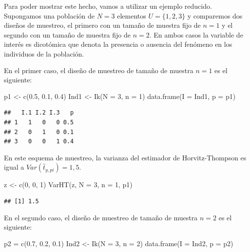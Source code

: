 \documentclass[
  10pt,
  spanish,
]{book}
\newenvironment{Shaded}{\begin{snugshade}}{\end{snugshade}}
\newcommand{\AttributeTok}[1]{\textcolor[rgb]{0.77,0.63,0.00}{#1}}
\newcommand{\DecValTok}[1]{\textcolor[rgb]{0.00,0.00,0.81}{#1}}
\newcommand{\FloatTok}[1]{\textcolor[rgb]{0.00,0.00,0.81}{#1}}
\newcommand{\FunctionTok}[1]{\textcolor[rgb]{0.00,0.00,0.00}{#1}}
\newcommand{\NormalTok}[1]{#1}
\newcommand{\OtherTok}[1]{\textcolor[rgb]{0.56,0.35,0.01}{#1}}
\begin{document}
Para poder mostrar este hecho, vamos a utilizar un ejemplo reducido. Supongamos una población de \(N = 3\) elementos \(U=\{1, 2, 3\}\) y comparemos dos diseños de muestreo, el primero con un tamaño de muestra fijo de \(n=1\) y el segundo con un tamaño de muestra fijo de \(n=2\). En ambos casos la variable de interés es dicotómica que denota la presencia o ausencia del fenómeno en los individuos de la población.

En el primer caso, el diseño de muestreo de tamaño de muestra \(n=1\) es el siguiente:

\begin{Shaded}
\begin{Highlighting}[]
\NormalTok{p1 }\OtherTok{\textless{}{-}} \FunctionTok{c}\NormalTok{(}\FloatTok{0.5}\NormalTok{, }\FloatTok{0.1}\NormalTok{, }\FloatTok{0.4}\NormalTok{)}
\NormalTok{Ind1 }\OtherTok{\textless{}{-}} \FunctionTok{Ik}\NormalTok{(}\AttributeTok{N =} \DecValTok{3}\NormalTok{, }\AttributeTok{n =} \DecValTok{1}\NormalTok{)}
\FunctionTok{data.frame}\NormalTok{(}\AttributeTok{I =}\NormalTok{ Ind1, }\AttributeTok{p =}\NormalTok{ p1)}
\end{Highlighting}
\end{Shaded}

\begin{verbatim}
##   I.1 I.2 I.3   p
## 1   1   0   0 0.5
## 2   0   1   0 0.1
## 3   0   0   1 0.4
\end{verbatim}

En este esquema de muestreo, la varianza del estimador de Horvitz-Thompson es igual a \(Var(\hat t_{y, pi}) = 1,5\).

\begin{Shaded}
\begin{Highlighting}[]
\NormalTok{z }\OtherTok{\textless{}{-}} \FunctionTok{c}\NormalTok{(}\DecValTok{0}\NormalTok{, }\DecValTok{0}\NormalTok{, }\DecValTok{1}\NormalTok{)}
\FunctionTok{VarHT}\NormalTok{(z, }\AttributeTok{N =} \DecValTok{3}\NormalTok{, }\AttributeTok{n =} \DecValTok{1}\NormalTok{, p1)}
\end{Highlighting}
\end{Shaded}

\begin{verbatim}
## [1] 1.5
\end{verbatim}

En el segundo caso, el diseño de muestreo de tamaño de muestra \(n=2\) es el siguiente:

\begin{Shaded}
\begin{Highlighting}[]
\NormalTok{p2 }\OtherTok{=} \FunctionTok{c}\NormalTok{(}\FloatTok{0.7}\NormalTok{, }\FloatTok{0.2}\NormalTok{, }\FloatTok{0.1}\NormalTok{)}
\NormalTok{Ind2 }\OtherTok{\textless{}{-}} \FunctionTok{Ik}\NormalTok{(}\AttributeTok{N =} \DecValTok{3}\NormalTok{, }\AttributeTok{n =} \DecValTok{2}\NormalTok{)}
\FunctionTok{data.frame}\NormalTok{(}\AttributeTok{I =}\NormalTok{ Ind2, }\AttributeTok{p =}\NormalTok{ p2)}
\end{Highlighting}
\end{Shaded}
\end{document}
